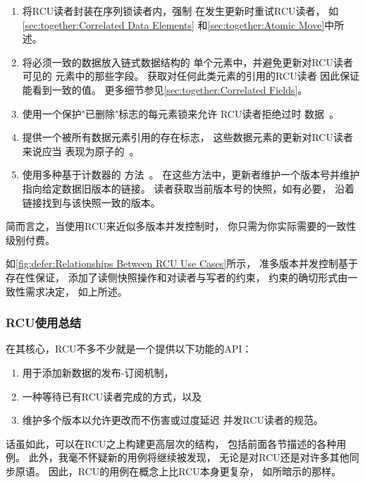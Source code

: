 \begin{enumerate}
\item	将RCU读者封装在序列锁读者内，强制
	在发生更新时重试RCU读者，
	如\cref{sec:together:Correlated Data Elements}
	和\cref{sec:together:Atomic Move}中所述。
\item	将必须一致的数据放入链式数据结构的
	单个元素中，并避免更新对RCU读者可见的
	元素中的那些字段。
	获取对任何此类元素的引用的RCU读者
	因此保证能看到一致的值。
	更多细节参见\cref{sec:together:Correlated Fields}。
\item	使用一个保护"已删除"标志的每元素锁来允许
	RCU读者拒绝过时
	数据~\cite{PaulEdwardMcKenneyPhD,Arcangeli03}。
\item	提供一个被所有数据元素引用的存在标志，
	这些数据元素的更新对RCU读者来说应当
	表现为原子的~\cite{PaulEMcKennneyAtomicTreeN4037,PaulEMcKennneyAtomicTreeCPPCON2014,PaulEMcKenneyIssaquahUpdate2015,PaulEMcKenney2016IssaquahACMApp,PaulEMcKenney2016IssaquahCPPCON}。
\item	使用多种基于计数器的
	方法~\cite{PaulEMcKenney2008cyclicRCU,PaulEMcKenney2010cyclicRCU,PaulEMcKenney2011cyclicparallelRCU,PaulEMcKenney2014cyclicRCU,Matveev:2015:RLS:2815400.2815406,Kim:2019:MSR:3297858.3304040}。
	在这些方法中，更新者维护一个版本号并维护
	指向给定数据旧版本的链接。
	读者获取当前版本号的快照，如有必要，
	沿着链接找到与该快照一致的版本。
\end{enumerate}

简而言之，当使用RCU来近似多版本并发控制时，
你只需为你实际需要的一致性级别付费。

如\cref{fig:defer:Relationships Between RCU Use Cases}所示，
准多版本并发控制基于存在性保证，
添加了读侧快照操作和对读者与写者的约束，
约束的确切形式由一致性需求决定，
如上所述。

\subsubsection{RCU使用总结}
\label{sec:defer:RCU Usage Summary}

在其核心，RCU不多不少就是一个提供以下功能的API：

\begin{enumerate}
\item	用于添加新数据的发布-订阅机制，
\item	一种等待已有RCU读者完成的方式，以及
\item	维护多个版本以允许更改而不伤害或过度延迟
	并发RCU读者的规范。
\end{enumerate}

话虽如此，可以在RCU之上构建更高层次的结构，
包括前面各节描述的各种用例。
此外，我毫不怀疑新的用例将继续被发现，
无论是对RCU还是对许多其他同步原语。
因此，RCU的用例在概念上比RCU本身更复杂，
如所暗示的那样。

